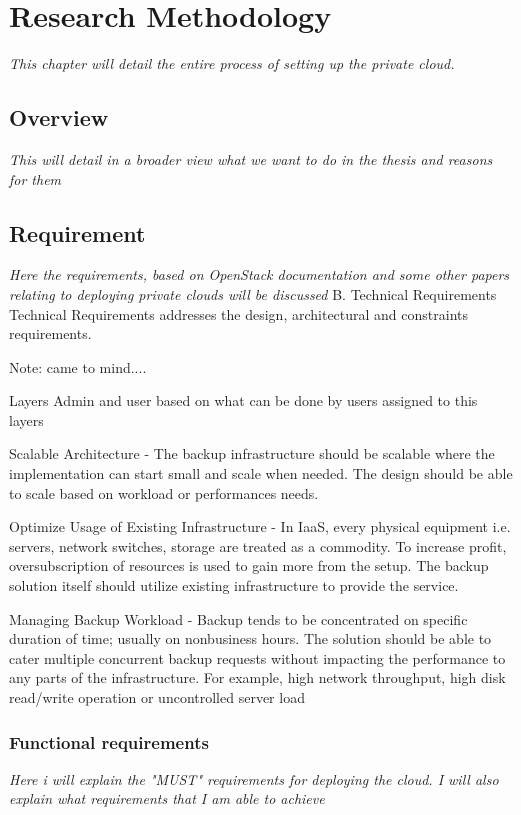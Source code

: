 \chapter{Research Methodology}\label{chapter:methodology}
\textit{This chapter will detail the entire process of setting up the private cloud.}
\section{Overview}
\textit{This will detail in a broader view what we want to do in the thesis and reasons for them}
\section{Requirement}
\textit{Here the requirements, based on OpenStack documentation and some other papers relating to deploying private clouds will be discussed}
B. Technical Requirements
Technical Requirements addresses the design, architectural and constraints requirements.

Note: came to mind....

Layers Admin and user based on what can be done by users assigned to this layers


Scalable Architecture -
The backup infrastructure should be scalable where the implementation can start small and scale when needed. The design should be able to scale based on workload or performances needs.

Optimize Usage of Existing Infrastructure -
In IaaS, every physical equipment i.e. servers, network switches, storage are treated as a commodity. To increase profit, oversubscription of resources is used to gain more from the setup. The backup solution itself should utilize existing infrastructure to provide the service.

Managing Backup Workload -
Backup tends to be concentrated on specific duration of time; usually on nonbusiness hours. The solution should be able to cater multiple concurrent backup requests without impacting the performance to any parts of the infrastructure. For example, high network throughput, high disk read/write operation or uncontrolled server load

\subsection{Functional requirements}
\textit{Here i will explain the "MUST" requirements for deploying the cloud. I will also explain what requirements that I am able to achieve}
